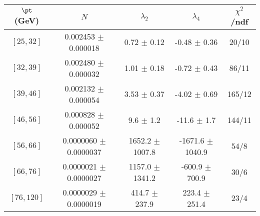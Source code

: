 \begin{tabular}{c||c|c|c|c}
$\pt$ (GeV) & $N$ & $\lambda_{2}$ & $\lambda_4$  & $\chi^2$/ndf  \\
\hline
$[25, 32]$ & 0.002453 $\pm$ 0.000018 & 0.72 $\pm$ 0.12 & -0.48 $\pm$ 0.36 & 20/10\\
$[32, 39]$ & 0.002480 $\pm$ 0.000032 & 1.01 $\pm$ 0.18 & -0.72 $\pm$ 0.43 & 86/11\\
$[39, 46]$ & 0.002132 $\pm$ 0.000054 & 3.53 $\pm$ 0.37 & -4.02 $\pm$ 0.69 & 165/12\\
$[46, 56]$ & 0.000828 $\pm$ 0.000052 & 9.6 $\pm$ 1.2 & -11.6 $\pm$ 1.7 & 144/11\\
$[56, 66]$ & 0.0000060 $\pm$ 0.0000037 & 1652.2 $\pm$ 1007.8 & -1671.6 $\pm$ 1040.9 & 54/8\\
$[66, 76]$ & 0.0000021 $\pm$ 0.0000027 & 1157.0 $\pm$ 1341.2 & -600.9 $\pm$ 700.9 & 30/6\\
$[76, 120]$ & 0.0000029 $\pm$ 0.0000019 & 414.7 $\pm$ 237.9 & 223.4 $\pm$ 251.4 & 23/4\\
\end{tabular}
